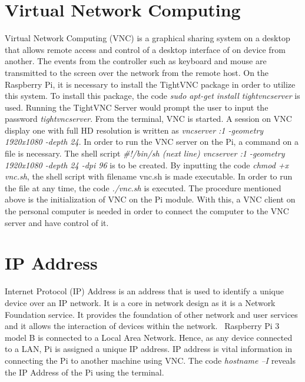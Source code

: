 \section{Virtual Network Computing}
Virtual Network Computing (VNC) is a graphical sharing system on a desktop that allows remote access and control of a desktop interface of on device from another. The events from the controller such as keyboard and mouse are transmitted to the screen over the network from the remote host. 
	On the Raspberry Pi, it is necessary to install the TightVNC package in order to utilize this system. To install this package, the code  \textsl{sudo apt-get install tightvncserver} is used. Running the TightVNC Server would prompt the user to input the password \textsl{tightvncserver}. From the terminal, VNC is started. A session on VNC display one with full HD resolution is written as \textsl{vncserver :1 -geometry 1920x1080 -depth 24}.
	In order to run the VNC server on the Pi, a command on a file is necessary. The shell script \textsl{#!/bin/sh (next line) vncserver :1 -geometry 1920x1080 -depth 24 -dpi 96} is to be created. By inputting the code \textsl{chmod +x vnc.sh}, the shell script with filename vnc.sh is made executable. In order to run the file at any time, the code \textsl{./vnc.sh} is executed.
	The procedure mentioned above is the initialization of VNC on the Pi module. With this, a VNC client on the personal computer is needed in order to connect the computer to the VNC server and have control of it.~\cite{vnc}
	
\section{IP Address}
	Internet Protocol (IP) Address is an address that is used to identify a unique device over an IP network. It is a core in network design as it is a Network Foundation service. It provides the foundation of other network and user services and it allows the interaction of devices within the network.~\cite{cisco}
	Raspberry Pi 3 model B is connected to a Local Area Network. Hence, as any device connected to a LAN, Pi is assigned a unique IP address. IP address is vital information in connecting the Pi to another machine using VNC. The code \textsl{hostname –I} reveals the IP Address of the Pi using the terminal.
		



